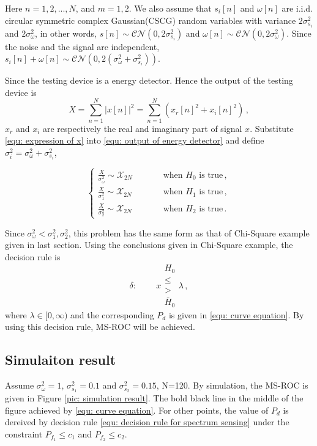 \documentclass[12pt,journal,a4paper,twoside,onecolumn]{IEEEtran}
\begin{document}
\begin{spacing}{2.5}
Here $n = 1, 2, ..., N$, and $m= 1, 2$. We also assume that $s_i[n]$ and $\omega[n]$ are i.i.d. circular symmetric complex Gaussian(CSCG) random variables with variance $2\sigma_{s_i}^2$ and $2\sigma_{\omega}^2$, in other words, $s[n] \sim \mathcal{CN}(0, 2\sigma_{s_i}^2) $ and $\omega[n] \sim \mathcal{CN}(0, 2\sigma_\omega^2)$. Since the noise and the signal are independent, $s_i[n] + \omega[n] \sim \mathcal{CN}(0, 2(\sigma_\omega^2 + \sigma_{s_i}^2))$.

Since the testing device is a energy detector. Hence the output of  the testing device is
\begin{equation}
  \label{equ: output of energy detector}
  X = \sum_{n=1}^{N}|x[n]|^2 = \sum_{n=1}^{N}(x_r[n]^2+x_i[n]^2)\,,
\end{equation}
$x_r$ and $x_i$ are respectively the real and imaginary part of signal $x$. Substitute \eqref{equ: expression of x} into \eqref{equ: output of energy detector} and define $\sigma_{i}^2 = \sigma_\omega^2 + \sigma_{s_i}^2$,

  \begin{equation}
   \label{v3eq7}
   \begin{cases}
     \frac{X}{\sigma_\omega^2} \sim \mathcal{X}_{2N}\;\;\;\;\;\;\;\;\;\;&\text{when $H_0$ is true}\,,\\
     \frac{X}{\sigma_1^2} \sim \mathcal{X}_{2N}\;\;\;\;\;\;\;\;\;\;&\text{when $H_1$ is true}\,,\\
     \frac{X}{\sigma_{2}^2} \sim \mathcal{X}_{2N}\;\;\;\;\;\;\;\;\;\;&\text{when $H_{2}$ is true}\,.
   \end{cases}
 \end{equation}


Since $\sigma_\omega^2 < \sigma_1^2, \sigma_2^2$, this problem has the same form as that of Chi-Square example given in last section.  Using the conclusions given in Chi-Square example,  the decision rule is
\begin{equation}
\label{equ: decision rule for spectrum sensing}
\delta:\;\;\;\;\;\;\;\; x \substack{H_0 \\ \leq \\ > \\\bar{H}_0} \lambda\,,
 \end{equation}
where $\lambda \in [0, \infty)$ and  the corresponding $P_d$ is given in \eqref{equ: curve equation}. By using this decision rule,  MS-ROC will be achieved.

\subsection{Simulaiton result}
Assume $\sigma_\omega^2 = 1$, $\sigma_{s_1}^2 = 0.1$ and $\sigma_{s_2}^2  = 0.15$, N=120. By simulation, the MS-ROC is given in Figure \ref{pic: simulation result}. The bold black line in the middle of the figure achieved by \eqref{equ: curve equation}. For other points, the value of $P_d$ is dereived by decision rule \eqref{equ: decision rule for spectrum sensing} under the constraint $P_{f_1} \leq c_1$ and $P_{f_2} \leq c_2$.


\end{spacing}
\end{document}

